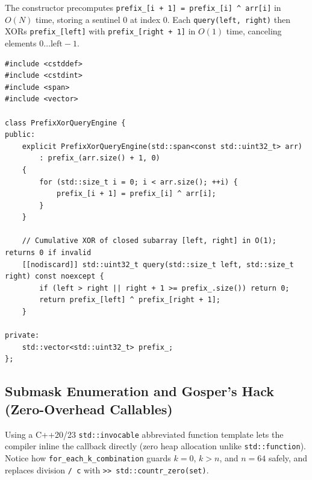 \documentclass[11pt,a4paper]{article}
\theoremstyle{definition}
\begin{document}
The constructor precomputes \texttt{prefix\_[i + 1] = prefix\_[i] \textasciicircum{} arr[i]} in $O(N)$ time, storing a sentinel $0$ at index $0$. Each \texttt{query(left, right)} then XORs \texttt{prefix\_[left]} with \texttt{prefix\_[right + 1]} in $O(1)$ time, canceling elements $0 \dots \text{left} - 1$.

\begin{lstlisting}[caption={Static Prefix XOR array supporting $O(N)$ build and $O(1)$ range queries}]
#include <cstddef>
#include <cstdint>
#include <span>
#include <vector>

class PrefixXorQueryEngine {
public:
    explicit PrefixXorQueryEngine(std::span<const std::uint32_t> arr)
        : prefix_(arr.size() + 1, 0)
    {
        for (std::size_t i = 0; i < arr.size(); ++i) {
            prefix_[i + 1] = prefix_[i] ^ arr[i];
        }
    }

    // Cumulative XOR of closed subarray [left, right] in O(1); returns 0 if invalid
    [[nodiscard]] std::uint32_t query(std::size_t left, std::size_t right) const noexcept {
        if (left > right || right + 1 >= prefix_.size()) return 0;
        return prefix_[left] ^ prefix_[right + 1];
    }

private:
    std::vector<std::uint32_t> prefix_;
};
\end{lstlisting}

\subsection{Submask Enumeration and Gosper's Hack (Zero-Overhead Callables)}

Using a C++20/23 \texttt{std::invocable} abbreviated function template lets the compiler inline the callback directly (zero heap allocation unlike \texttt{std::function}). Notice how \texttt{for\_each\_k\_combination} guards $k = 0$, $k > n$, and $n = 64$ safely, and replaces division \texttt{/ c} with \texttt{>> std::countr\_zero(set)}.
\end{document}
